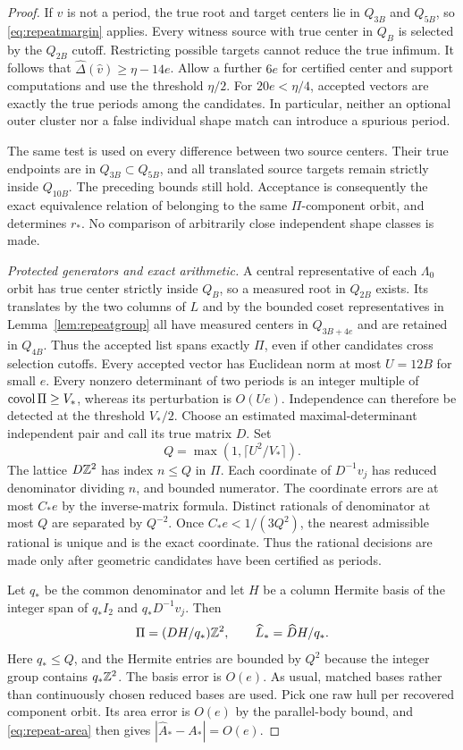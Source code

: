 \begin{proof}
If $v$ is not a period, the true root and target centers lie in
$Q_{3B}$ and $Q_{5B}$, so \eqref{eq:repeatmargin} applies. Every witness
source with true center in $Q_B$ is selected by the $Q_{2B}$ cutoff.
Restricting possible targets cannot reduce the true infimum. It follows
that $\widehat\Delta(\widehat v)\ge\eta-14e$. Allow a further $6e$ for
certified center and support computations and use the threshold $\eta/2$.
For $20e<\eta/4$, accepted vectors are exactly the true periods among
the candidates. In particular, neither an optional outer cluster nor
a false individual shape match can introduce a spurious period.

The same test is used on every difference between two source centers.
Their true endpoints are in $Q_{3B}\subset Q_{5B}$, and all translated
source targets remain strictly inside $Q_{10B}$. The preceding bounds
still hold. Acceptance is consequently the exact equivalence relation
of belonging to the same $\Pi$-component orbit, and determines $r_*$.
No comparison of arbitrarily close independent shape classes is made.

\emph{Protected generators and exact arithmetic.}
A central representative of each $\Lambda_0$ orbit has true center
strictly inside $Q_B$, so a measured root in $Q_{2B}$ exists. Its
translates by the two columns of $L$ and by the bounded coset
representatives in Lemma~\ref{lem:repeatgroup} all have measured centers
in $Q_{3B+4e}$ and are retained in $Q_{4B}$. Thus the accepted list
spans exactly $\Pi$, even if other candidates cross selection cutoffs.
Every accepted vector has Euclidean norm at most $U=12B$ for small $e$.
Every nonzero determinant of two periods is an integer multiple of
$\operatorname{covol}\Pi\ge V_*$, whereas its perturbation is $O(Ue)$.
Independence can therefore be detected at the threshold $V_*/2$.
Choose an estimated maximal-determinant independent pair and call its
true matrix $D$. Set
\[
                         Q=\max(1,\lceil U^2/V_*\rceil).
\]
The lattice $D\mathbb Z^2$ has index $n\le Q$ in $\Pi$. Each coordinate of
$D^{-1}v_j$ has reduced denominator dividing $n$, and bounded numerator.
The coordinate errors are at most $C_*e$ by the inverse-matrix formula.
Distinct rationals of denominator at most $Q$ are separated by
$Q^{-2}$. Once $C_*e<1/(3Q^2)$, the nearest admissible rational is
unique and is the exact coordinate. Thus the rational decisions are
made only after geometric candidates have been certified as periods.

Let $q_*$ be the common denominator and let $H$ be a column Hermite
basis of the integer span of $q_*I_2$ and $q_*D^{-1}v_j$. Then
\begin{equation}\label{eq:repeatbasis}
              \Pi=(DH/q_*)\mathbb Z^2,\qquad
              \widehat L_*=\widehat D H/q_*.
\end{equation}
Here $q_*\le Q$, and the Hermite entries are bounded by $Q^2$ because
the integer group contains $q_*\mathbb Z^2$. The basis error is $O(e)$.
As usual, matched bases rather than continuously chosen reduced bases
are used. Pick one raw hull per recovered component orbit. Its area
error is $O(e)$ by the parallel-body bound, and \eqref{eq:repeat-area}
then gives $|\widehat A_*-A_*|=O(e)$.


\end{proof}

